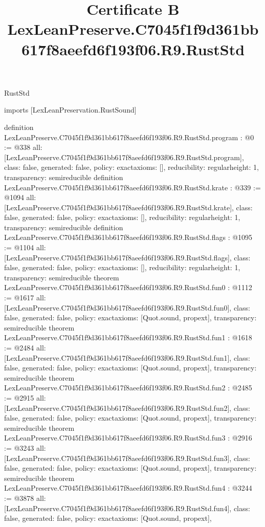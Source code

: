 \begin{lexlean}{RustStd}
\title{Certificate B LexLeanPreserve.C7045f1f9d361bb617f8aeefd6f193f06.R9.RustStd}
\begin{coremodule}
imports [LexLeanPreservation.RustSound]

definition LexLeanPreserve.C7045f1f9d361bb617f8aeefd6f193f06.R9.RustStd.program : @0 := @338 {
  all: [LexLeanPreserve.C7045f1f9d361bb617f8aeefd6f193f06.R9.RustStd.program],
  class: false,
  generated: false,
  policy: exact{axioms: []},
  reducibility: regular{height: 1},
  transparency: semireducible
}
definition LexLeanPreserve.C7045f1f9d361bb617f8aeefd6f193f06.R9.RustStd.krate : @339 := @1094 {
  all: [LexLeanPreserve.C7045f1f9d361bb617f8aeefd6f193f06.R9.RustStd.krate],
  class: false,
  generated: false,
  policy: exact{axioms: []},
  reducibility: regular{height: 1},
  transparency: semireducible
}
definition LexLeanPreserve.C7045f1f9d361bb617f8aeefd6f193f06.R9.RustStd.flags : @1095 := @1104 {
  all: [LexLeanPreserve.C7045f1f9d361bb617f8aeefd6f193f06.R9.RustStd.flags],
  class: false,
  generated: false,
  policy: exact{axioms: []},
  reducibility: regular{height: 1},
  transparency: semireducible
}
theorem LexLeanPreserve.C7045f1f9d361bb617f8aeefd6f193f06.R9.RustStd.fun0 : @1112 := @1617 {
  all: [LexLeanPreserve.C7045f1f9d361bb617f8aeefd6f193f06.R9.RustStd.fun0],
  class: false,
  generated: false,
  policy: exact{axioms: [Quot.sound, propext]},
  transparency: semireducible
}
theorem LexLeanPreserve.C7045f1f9d361bb617f8aeefd6f193f06.R9.RustStd.fun1 : @1618 := @2484 {
  all: [LexLeanPreserve.C7045f1f9d361bb617f8aeefd6f193f06.R9.RustStd.fun1],
  class: false,
  generated: false,
  policy: exact{axioms: [Quot.sound, propext]},
  transparency: semireducible
}
theorem LexLeanPreserve.C7045f1f9d361bb617f8aeefd6f193f06.R9.RustStd.fun2 : @2485 := @2915 {
  all: [LexLeanPreserve.C7045f1f9d361bb617f8aeefd6f193f06.R9.RustStd.fun2],
  class: false,
  generated: false,
  policy: exact{axioms: [Quot.sound, propext]},
  transparency: semireducible
}
theorem LexLeanPreserve.C7045f1f9d361bb617f8aeefd6f193f06.R9.RustStd.fun3 : @2916 := @3243 {
  all: [LexLeanPreserve.C7045f1f9d361bb617f8aeefd6f193f06.R9.RustStd.fun3],
  class: false,
  generated: false,
  policy: exact{axioms: [Quot.sound, propext]},
  transparency: semireducible
}
theorem LexLeanPreserve.C7045f1f9d361bb617f8aeefd6f193f06.R9.RustStd.fun4 : @3244 := @3878 {
  all: [LexLeanPreserve.C7045f1f9d361bb617f8aeefd6f193f06.R9.RustStd.fun4],
  class: false,
  generated: false,
  policy: exact{axioms: [Quot.sound, propext]},
}
\end{coremodule}
\end{lexlean}
